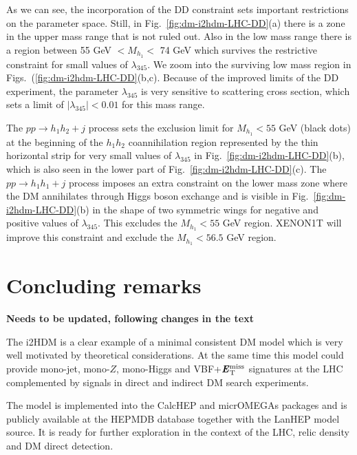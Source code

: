 \documentclass[12pt,a4paper]{article}
\newcommand {\red} {\color{red}}
\newcommand{\MET}{\textbf{\textit{E}$_{\rm T}^{\rm miss}$}}
\begin{document}
As we can see, the incorporation of the DD constraint sets important restrictions on the parameter space. Still, in Fig.~\ref{fig:dm-i2hdm-LHC-DD}(a) there is a zone in the upper mass range that is not ruled out. Also in the low mass range there is a region between 55 GeV $< M_{h_1} <$ 74 GeV
which survives the restrictive constraint for small values of $\lambda_{345}$. We zoom into the surviving low mass region in Figs.~(\ref{fig:dm-i2hdm-LHC-DD}(b,c). Because of the improved limits of the DD experiment, the parameter $\lambda_{345}$ is very sensitive to scattering cross section, 
which sets a limit of $|\lambda_{345}|<0.01$ for this mass range.

The $pp \to h_1h_2+j$ process sets the exclusion limit for $M_{h_1}<55$ GeV (black dots) at the beginning of the $h_1 h_2$ coannihilation region represented by the thin horizontal strip for very small values of $\lambda_{345}$ in Fig.~\ref{fig:dm-i2hdm-LHC-DD}(b), which is also seen in the lower part of Fig.~\ref{fig:dm-i2hdm-LHC-DD}(c). The $pp \to h_1 h_1 + j$ process imposes an extra constraint on the lower mass zone where the DM annihilates through Higgs boson exchange and is visible in Fig.~\ref{fig:dm-i2hdm-LHC-DD}(b) in the shape of two symmetric wings for negative and positive values of $\lambda_{345}$. This excludes the $M_{h_1}<55$ GeV region. XENON1T will improve this constraint and exclude the $M_{h_1}<56.5$ GeV region.

%
\section{Concluding remarks}

{\red \bf Needs to be updated, following changes in the text}

The i2HDM is a clear example of a minimal consistent DM model which is
very well motivated by theoretical considerations.
At the same time this model could provide
 mono-jet, mono-$Z$, mono-Higgs and VBF+$\MET{}$
signatures at the LHC
complemented by
signals in direct and indirect DM search experiments.

The model is implemented into the CalcHEP and micrOMEGAs packages
and is publicly available at the HEPMDB database together with the
LanHEP model source. It is ready for further
exploration in the context of the LHC, relic density and DM direct detection.
\end{document}
